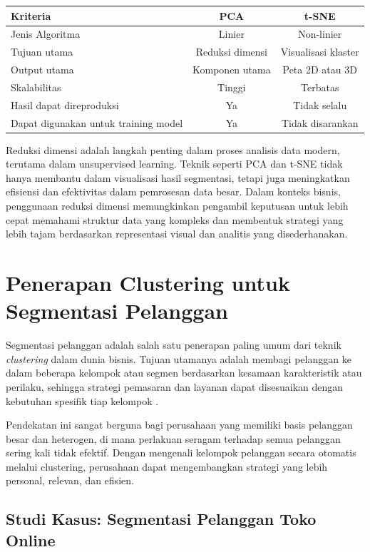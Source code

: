 \begin{center}
	\begin{tabular}{|l|c|c|}
		\hline
		\textbf{Kriteria} & \textbf{PCA} & \textbf{t-SNE} \\
		\hline
		Jenis Algoritma & Linier & Non-linier \\
		Tujuan utama & Reduksi dimensi & Visualisasi klaster \\
		Output utama & Komponen utama & Peta 2D atau 3D \\
		Skalabilitas & Tinggi & Terbatas \\
		Hasil dapat direproduksi & Ya & Tidak selalu \\
		Dapat digunakan untuk training model & Ya & Tidak disarankan \\
		\hline
	\end{tabular}
\end{center}


Reduksi dimensi adalah langkah penting dalam proses analisis data modern, terutama dalam unsupervised learning. Teknik seperti PCA dan t-SNE tidak hanya membantu dalam visualisasi hasil segmentasi, tetapi juga meningkatkan efisiensi dan efektivitas dalam pemrosesan data besar. Dalam konteks bisnis, penggunaan reduksi dimensi memungkinkan pengambil keputusan untuk lebih cepat memahami struktur data yang kompleks dan membentuk strategi yang lebih tajam berdasarkan representasi visual dan analitis yang disederhanakan.


\section{Penerapan Clustering untuk Segmentasi Pelanggan}

Segmentasi pelanggan adalah salah satu penerapan paling umum dari teknik \textit{clustering} dalam dunia bisnis. Tujuan utamanya adalah membagi pelanggan ke dalam beberapa kelompok atau segmen berdasarkan kesamaan karakteristik atau perilaku, sehingga strategi pemasaran dan layanan dapat disesuaikan dengan kebutuhan spesifik tiap kelompok \cite{williams2020data}.

Pendekatan ini sangat berguna bagi perusahaan yang memiliki basis pelanggan besar dan heterogen, di mana perlakuan seragam terhadap semua pelanggan sering kali tidak efektif. Dengan mengenali kelompok pelanggan secara otomatis melalui clustering, perusahaan dapat mengembangkan strategi yang lebih personal, relevan, dan efisien.

\subsection*{Studi Kasus: Segmentasi Pelanggan Toko Online}


